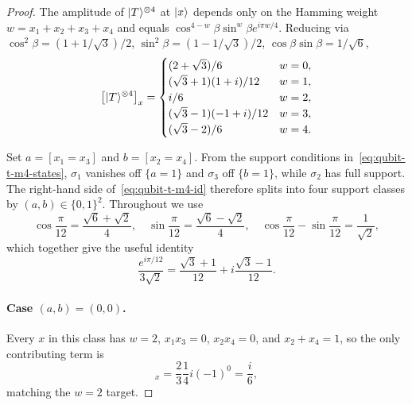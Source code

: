 \documentclass[11pt]{article}
\theoremstyle{definition}
\newcommand{\microspace}{\mspace{0.5mu}}
\newcommand{\ket}[1]{\lvert\microspace #1 \microspace \rangle}
\begin{document}
	\begin{proof}
		The amplitude of $\ket{T}^{\otimes 4}$ at $\ket x$ depends only
		on the Hamming weight $w = x_1 + x_2 + x_3 + x_4$ and equals
		$\cos^{4-w}\!\beta \sin^w\!\beta e^{i \pi w / 4}$. Reducing
		via $\cos^2\beta = (1+1/\sqrt 3)/2$,
		$\sin^2\beta = (1-1/\sqrt 3)/2$, $\cos\beta \sin\beta = 1/\sqrt 6$,
		\begin{equation}\label{eq:qubit-t-m4-targets}
			\bigl[\ket{T}^{\otimes 4}\bigr]_x
			=
			\begin{cases}
				(2 + \sqrt 3)/6 & w = 0,\\
				(\sqrt 3 + 1)(1 + i)/12 & w = 1,\\
				i/6 & w = 2,\\
				(\sqrt 3 - 1)(-1 + i)/12 & w = 3,\\
				(\sqrt 3 - 2)/6 & w = 4.
			\end{cases}
		\end{equation}

		Set $a = [x_1 = x_3]$ and $b = [x_2 = x_4]$. From the support
		conditions in~\eqref{eq:qubit-t-m4-states}, $\sigma_1$ vanishes
		off $\{a = 1\}$ and $\sigma_3$ off $\{b = 1\}$, while $\sigma_2$
		has full support. The right-hand side
		of~\eqref{eq:qubit-t-m4-id} therefore splits into four
		support classes by $(a, b) \in \{0, 1\}^2$. Throughout we use
		\begin{equation}\label{eq:qubit-t-m4-trig}
			\cos\frac{\pi}{12} = \frac{\sqrt 6 + \sqrt 2}{4},
			\quad
			\sin\frac{\pi}{12} = \frac{\sqrt 6 - \sqrt 2}{4},
			\quad
			\cos\frac{\pi}{12} - \sin\frac{\pi}{12} = \frac{1}{\sqrt 2},
		\end{equation}
		which together give the useful identity
		\begin{equation}\label{eq:qubit-t-m4-prefactor}
			\frac{e^{i \pi / 12}}{3 \sqrt 2}
			= \frac{\sqrt 3 + 1}{12} + i \frac{\sqrt 3 - 1}{12}.
		\end{equation}

		\paragraph{Case $(a, b) = (0, 0)$.}
		Every $x$ in this class has $w = 2$, $x_1 x_3 = 0$,
		$x_2 x_4 = 0$, and $x_2 + x_4 = 1$, so the only contributing
		term is
		\begin{equation}
			[c_2 \sigma_2]_x
			= \frac{2}{3} \frac{1}{4} i (-1)^0
			= \frac{i}{6},
		\end{equation}
		matching the $w = 2$ target.


\end{proof}
\end{document}
